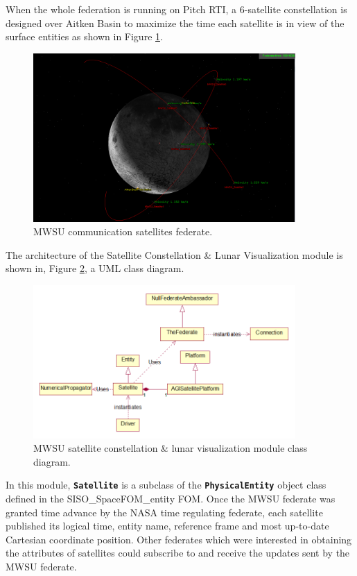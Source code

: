 \documentclass[journal, onecolumn]{IEEEtran}
\newcommand\uml[1]{\texttt{\textbf{#1}}}
\begin{document}
When the whole federation is running on Pitch RTI, a 6-satellite constellation is designed over Aitken Basin to maximize the time each satellite is in view of the surface entities as shown in Figure \ref{Satellites}.
\begin{figure}[!htbp]
	\centering
		\includegraphics[width=100mm]{Satellites.PNG}
		\caption{MWSU communication satellites federate.}
	\label{Satellites}
\end{figure}

The architecture of the Satellite Constellation \& Lunar Visualization module is shown in, Figure \ref {Class}, a UML class diagram.

\begin{figure}[!htbp]
	\centering
		\includegraphics[width=100mm]{ClassDiagram.png}
		\caption{MWSU satellite constellation \& lunar visualization module class diagram.}
	\label{Class}
\end{figure}
 
In this module, \uml{Satellite} is a subclass of the \uml{PhysicalEntity} object class defined in the SISO\_SpaceFOM\_entity FOM.  Once the MWSU federate was granted time advance by the NASA time regulating federate, each satellite published its logical time, entity name, reference frame and most up-to-date Cartesian coordinate position. Other federates which were interested in obtaining the attributes of satellites could subscribe to and receive the updates sent by the MWSU federate.
\end{document}
